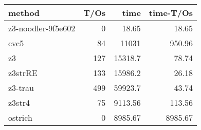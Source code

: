 \begin{tabular}{lrrr}
\hline
 method             &   T/Os &     time &   time-T/Os \\
\hline
 z3-noodler-9f5e602 &      0 &    18.65 &       18.65 \\
 cvc5               &     84 & 11031    &      950.96 \\
 z3                 &    127 & 15318.7  &       78.74 \\
 z3strRE            &    133 & 15986.2  &       26.18 \\
 z3-trau            &    499 & 59923.7  &       43.74 \\
 z3str4             &     75 &  9113.56 &      113.56 \\
 ostrich            &      0 &  8985.67 &     8985.67 \\
\hline
\end{tabular}
